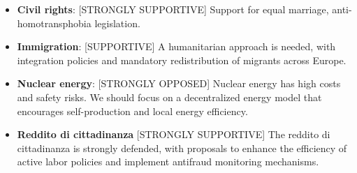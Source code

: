 \label{M5S_opinions}

\begin{tcolorbox}[prompt]
\begin{itemize}
    \item \textbf{Civil rights}:
        [STRONGLY SUPPORTIVE] Support for equal marriage, anti-homotransphobia legislation.
    \item \textbf{Immigration}:
        [SUPPORTIVE] A humanitarian approach is needed, with integration policies and mandatory redistribution of migrants across Europe.        
    \item \textbf{Nuclear energy}: 
        [STRONGLY OPPOSED] Nuclear energy has high costs and safety risks. We should focus on a decentralized energy model that encourages self-production and local energy efficiency.
    \item \textbf{Reddito di cittadinanza}
        [STRONGLY SUPPORTIVE] The reddito di cittadinanza is strongly defended, with proposals to enhance the efficiency of active labor policies and implement antifraud monitoring mechanisms.
\end{itemize}
\end{tcolorbox}